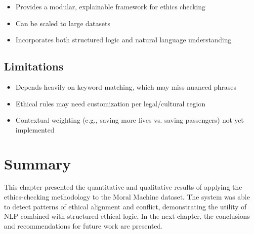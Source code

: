 \begin{itemize}
    \item Provides a modular, explainable framework for ethics checking
    \item Can be scaled to large datasets
    \item Incorporates both structured logic and natural language understanding
\end{itemize}

\subsection{Limitations}

\begin{itemize}
    \item Depends heavily on keyword matching, which may miss nuanced phrases
    \item Ethical rules may need customization per legal/cultural region
    \item Contextual weighting (e.g., saving more lives vs. saving passengers) not yet implemented
\end{itemize}

\section{Summary}

This chapter presented the quantitative and qualitative results of applying the ethics-checking methodology to the Moral Machine dataset. The system was able to detect patterns of ethical alignment and conflict, demonstrating the utility of NLP combined with structured ethical logic. In the next chapter, the conclusions and recommendations for future work are presented.

